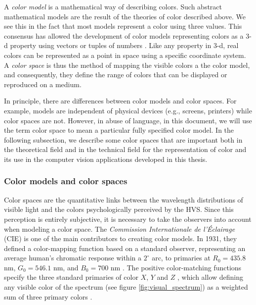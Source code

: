 A \textit{color model} is a mathematical way of describing colors. Such abstract mathematical models are the result of the theories of color described above. We see this in the fact that most models represent a color using three values. This consensus has allowed the development of color models representing colors as a 3-d property using vectors or tuples of numbers \citep{Douglas.Kerr:Online:2005}. Like any property in 3-d, real colors can be represented as a point in space using a specific coordinate system. A \textit{color space} is thus the method of mapping the visible colors a the color model, and consequently, they define the range of colors that can be displayed or reproduced on a medium.

In principle, there are differences between color models and color spaces. For example, models are independent of physical devices (e.g., screens, printers) while color spaces are not. However, in abuse of language, in this document, we will use the term color space to mean a particular fully specified color model. In the following subsection, we describe some color spaces that are important both in the theoretical field and in the technical field for the representation of color and its use in the computer vision applications developed in this thesis.
 

\subsubsection{Color models and color spaces}
Color spaces are the quantitative links between the wavelength distributions of visible light and the colors psychologically perceived by the HVS. Since this perception is entirely subjective, it is necessary to take the observers into account when modeling a color space. The \textit{Commission Internationale de l'Éclairage} (CIE) is one of the main contributors to creating color models. In 1931, they defined a color-mapping function based on a standard observer, representing an average human's chromatic response within a $2^ \circ$ arc, to primaries at $R_0 = 435.8$ nm, $G_0 = 546.1$ nm, and $B_0 = 700$ nm \citep{Bull:Book:2014}. The positive color-matching functions specify the three standard primaries of color $X$, $Y$ and $Z$ \citep{CIE:Journal:1932}, which allow defining any visible color of the spectrum (see figure \ref{fig:visual_spectrum}) as a weighted sum of three primary colors \citep{Wright:BookCh2:2007}.

